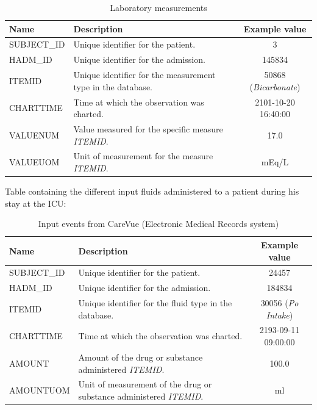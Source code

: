 \begin{table}[H]
 \begin{center}
  \caption{Laboratory measurements}
  \begin{tabular}{| l | p{7cm} | c | }
   \hline
   \textbf{Name} & \textbf{Description} & \textbf{Example value} \\ \hline
   SUBJECT\_ID &  Unique identifier for the patient. & 3 \\ \hline
   HADM\_ID & Unique identifier for the admission. & 145834 \\ \hline
   ITEMID & Unique identifier for the measurement type in the database. & 50868 (\textit{Bicarbonate}) \\ \hline
   CHARTTIME & Time at which the observation was charted. & 2101-10-20 16:40:00 \\ \hline
   VALUENUM & Value measured for the specific measure \textit{ITEMID}. & 17.0 \\ \hline
   VALUEUOM & Unit of measurement for the measure \textit{ITEMID}. & mEq/L \\
   \hline
  \end{tabular}
 \end{center}
\end{table}

Table containing the different input fluids administered to a patient during his stay at the ICU:

\begin{table}[H]
 \begin{center}
  \caption{Input events from CareVue (Electronic Medical Records system)}
  \begin{tabular}{| l | p{7cm} | c | }
   \hline
   \textbf{Name} & \textbf{Description} & \textbf{Example value} \\ \hline
   SUBJECT\_ID &  Unique identifier for the patient. & 24457 \\ \hline
   HADM\_ID & Unique identifier for the admission. & 184834 \\ \hline
   ITEMID & Unique identifier for the fluid type in the database. & 30056 (\textit{Po Intake}) \\ \hline
   CHARTTIME & Time at which the observation was charted. & 2193-09-11 09:00:00 \\ \hline
   AMOUNT & Amount of the drug or substance administered \textit{ITEMID}. & 100.0 \\ \hline
   AMOUNTUOM & Unit of measurement of the drug or substance administered \textit{ITEMID}. & ml \\
   \hline
  \end{tabular}
 \end{center}
\end{table}

